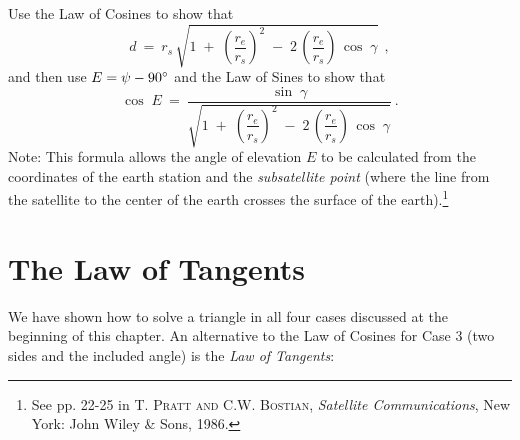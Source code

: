 {\begin{enumerate}[\bfseries 1.]
\begin{figure}[h]
 \begin{center}
  \vspace{-5mm}
 \end{center}
 \caption[]{}
 \label{fig:satellite}
\end{figure}

Use the Law of Cosines to show that
\begin{displaymath}
 d ~=~ r_s \,\sqrt{1 \;+\; \left( \frac{r_e}{r_s} \right)^2 \;-\; 2\,\left( \frac{r_e}{r_s} \right)
 \,\cos\;\gamma} ~~,
\end{displaymath}
and then use $E=\psi-90^\circ$ and the Law of Sines to show that
\begin{displaymath}
 \cos\;E ~=~ \dfrac{\sin\;\gamma}{\sqrt{1 \;+\; \left( \dfrac{r_e}{r_s} \right)^2 \;-\;
  2\,\left( \dfrac{r_e}{r_s} \right) \,\cos\;\gamma}} ~.
\end{displaymath}
Note: This formula allows the angle of elevation $E$ to be calculated from the coordinates of the
earth station and the \emph{subsatellite point} (where the line from the satellite to the center of
the earth crosses the surface of the earth).\footnote{See pp. 22-25 in \textsc{T. Pratt and C.W.
Bostian}, \emph{Satellite Communications}, New York: John Wiley \& Sons, 1986.}
\end{enumerate}}
\newpage
\section{The Law of Tangents}
We have shown how to solve a triangle in all four cases discussed at the beginning of this chapter.
An alternative to the Law of Cosines for Case 3 (two sides and the included angle) is the
\emph{Law of Tangents}:

